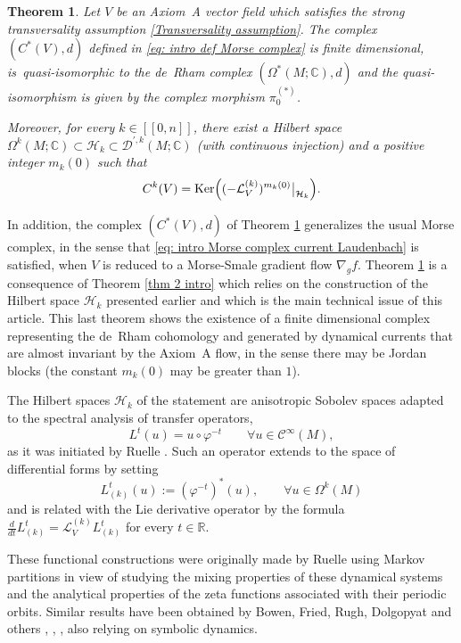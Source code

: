 \documentclass[JEP,XML,SOM,Unicode,NoEqCountersInSection,NoFloatCountersInSection,published]{cedram}
\newcommand{\lcr}{[\![}
\newcommand{\rcr}{]\!]}
\theoremstyle{definition}
\theoremstyle{plain}
\newtheorem{thm}{Theorem}
\newcommand{\Ccal}{\mathcal{C}}
\newcommand{\C}{\mathbb{C}}
\newcommand{\D}{\mathcal{D}}
\newcommand{\Hil}{\mathcal{H}}
\newcommand{\Lie}{\mathcal{L}}
\newcommand{\R}{\mathbb{R}}
\DeclareMathOperator{\Ker}{Ker}
\def\rest#1#2{\mathchoice
{\setbox1\hbox{${\displaystyle #1}_{\scriptstyle #2}$}
\restrictionaux{#1}{#2}}
{\setbox1\hbox{${\textstyle #1}_{\scriptstyle #2}$}
\restrictionaux{#1}{#2}}
{\setbox1\hbox{${\scriptstyle #1}_{\scriptscriptstyle #2}$}
\restrictionaux{#1}{#2}}
{\setbox1\hbox{${\scriptscriptstyle #1}_{\scriptscriptstyle #2}$}
\restrictionaux{#1}{#2}}}
\def\restrictionaux#1#2{{#1\,\smash{\vrule height.8\ht1 depth.85\dp1}}_{\,#2}}
\begin{document}
\begin{thm}\label{thm intro}
Let $V$ be an Axiom~A vector field which satisfies the strong transversality assumption \eqref{Transversality assumption}. The complex $(C^* (V),d)$ defined in \eqref{eq: intro def Morse complex} is finite dimensional, is~quasi-isomorphic to the de~Rham complex $(\Omega^* (M;\C),d)$ and the quasi-isomorphism is given by the complex morphism $\pi_0^{(*)}$.

Moreover, for every $k\in\lcr0,n\rcr$, there exist a Hilbert space $\Omega^k (M;\C) \subset \Hil_k \subset \D^{\prime,k} (M;\C)$ (with continuous injection) and a positive integer $m_k (0)$ such that
\[
C^k (V) = \Ker \Bigl(\rest{(-\Lie_V^{(k)})^{m_{k} (0)}}{\Hil_{k}} \Bigr).
\]
\end{thm}

In addition, the complex $(C^* (V), d)$ of Theorem \ref{thm intro} generalizes the usual Morse complex, in the sense that \eqref{eq: intro Morse complex current Laudenbach} is satisfied, when $V$ is reduced to a Morse-Smale gradient flow $\nabla_g f$. Theorem \ref{thm intro} is a consequence of Theorem \ref{thm 2 intro} which relies on the construction of the Hilbert space $\Hil_k$ presented earlier and which is the main technical issue of this article. This last theorem shows the existence of a finite dimensional complex representing the de~Rham cohomology and generated by dynamical currents that are almost invariant by the Axiom~A flow, in the sense there may be Jordan blocks (the constant $m_k (0)$ may be greater than $1$).

The Hilbert spaces $\Hil_k$ of the statement are anisotropic Sobolev spaces adapted to the spectral analysis of transfer operators,
\[
L^t (u) = u \circ \varphi^{-t} \qquad \forall u \in \Ccal^{\infty} (M),
\]
as it was initiated by Ruelle \cite{ruelle, ruelle_book}. Such an operator extends to the space of differential forms by setting
\[
L_{(k)}^t (u):= (\varphi^{-t})^* (u), \qquad \forall u \in \Omega^k (M)
\]
and is related with the Lie derivative operator by the formula $\frac{d}{dt} L_{(k)}^t = \Lie_V^{(k)} L_{(k)}^t$ for every $t \in \R$.


These functional constructions were originally made by Ruelle using Markov partitions in view of studying the mixing properties of these dynamical systems and the analytical properties of the zeta functions associated with their periodic orbits. Similar results have been obtained by Bowen, Fried, Rugh, Dolgopyat and others \cite{bowen2}, \cite{fried_meromorphic}, \cite{rugh}, \cite{dolgopyat} also relying on symbolic dynamics.
\end{document}
